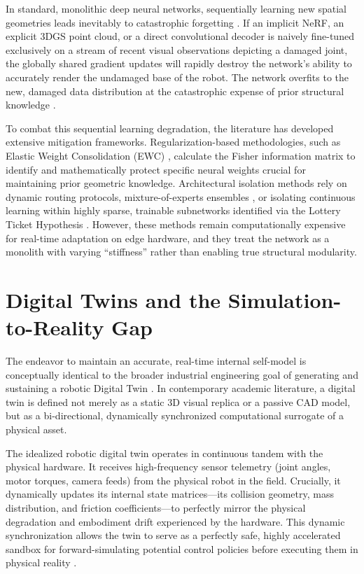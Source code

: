 \documentclass[12pt,a4paper,oneside]{report}
\begin{document}
In standard, monolithic deep neural networks, sequentially learning new spatial geometries leads inevitably to catastrophic forgetting \cite{mccloskey1989catastrophic, french1999catastrophic}. If an implicit NeRF, an explicit 3DGS point cloud, or a direct convolutional decoder is naively fine-tuned exclusively on a stream of recent visual observations depicting a damaged joint, the globally shared gradient updates will rapidly destroy the network's ability to accurately render the undamaged base of the robot. The network overfits to the new, damaged data distribution at the catastrophic expense of prior structural knowledge \cite{kirkpatrick2017overcoming}.

To combat this sequential learning degradation, the literature has developed extensive mitigation frameworks. Regularization-based methodologies, such as Elastic Weight Consolidation (EWC) \cite{kirkpatrick2017overcoming}, calculate the Fisher information matrix to identify and mathematically protect specific neural weights crucial for maintaining prior geometric knowledge. Architectural isolation methods rely on dynamic routing protocols, mixture-of-experts ensembles \cite{mocanu2018scalable}, or isolating continuous learning within highly sparse, trainable subnetworks identified via the Lottery Ticket Hypothesis \cite{frankle2018lottery}. However, these methods remain computationally expensive for real-time adaptation on edge hardware, and they treat the network as a monolith with varying ``stiffness'' rather than enabling true structural modularity.
\section{Digital Twins and the Simulation-to-Reality Gap}
\label{sec:digital_twins}

The endeavor to maintain an accurate, real-time internal self-model is conceptually identical to the broader industrial engineering goal of generating and sustaining a robotic Digital Twin \cite{jiang2024digitaltwin, mari2024digitaltwin}. In contemporary academic literature, a digital twin is defined not merely as a static 3D visual replica or a passive CAD model, but as a bi-directional, dynamically synchronized computational surrogate of a physical asset.

The idealized robotic digital twin operates in continuous tandem with the physical hardware. It receives high-frequency sensor telemetry (joint angles, motor torques, camera feeds) from the physical robot in the field. Crucially, it dynamically updates its internal state matrices---its collision geometry, mass distribution, and friction coefficients---to perfectly mirror the physical degradation and embodiment drift experienced by the hardware. This dynamic synchronization allows the twin to serve as a perfectly safe, highly accelerated sandbox for forward-simulating potential control policies before executing them in physical reality \cite{sun2026digitaltwin, murugesan2024digitaltwin}.
\end{document}
